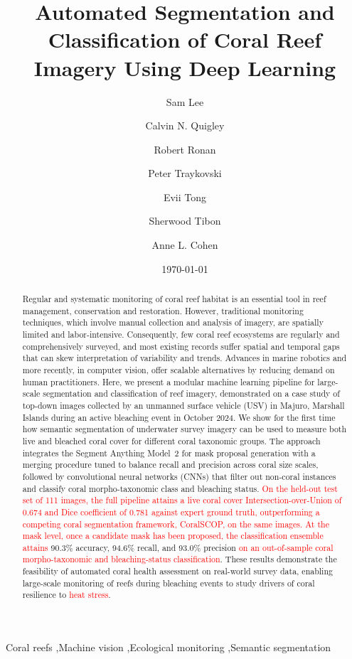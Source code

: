 \documentclass[11pt]{elsarticle}
\date{\today}
\newcommand{\revadd}[1]{\textcolor{red}{#1}}
\newcommand{\revdel}[1]{%
  \sbox\revdelbox{#1}%
  \makebox[0pt][l]{\raisebox{0.45ex}{\rule{\wd\revdelbox}{0.4pt}}}\usebox\revdelbox
}
\begin{document}
\begin{frontmatter}

\title{Automated Segmentation and Classification of Coral Reef Imagery Using Deep Learning}

\author[1,2]{Sam Lee}
\author[2]{Calvin N. Quigley}
\author[2]{Robert Ronan}
\author[2]{Peter Traykovski}
\author[2]{Evii Tong}
\author{Sherwood Tibon}
\author[2]{Anne L. Cohen}


\begin{abstract}
Regular and systematic monitoring of coral reef habitat is an essential tool in reef management, conservation and restoration. However, traditional monitoring techniques, which involve manual collection and analysis of imagery, are spatially limited and labor-intensive. Consequently, few coral reef ecosystems are regularly and comprehensively surveyed, and most existing records suffer spatial and temporal gaps that can skew interpretation of variability and trends. Advances in marine robotics and more recently, in computer vision, offer scalable alternatives by reducing demand on human practitioners. Here, we present a modular machine learning pipeline for large-scale segmentation and classification of reef imagery, demonstrated on a case study of top-down images collected by an unmanned surface vehicle (USV) in Majuro, Marshall Islands during an active bleaching event in October 2024. We show for the first time how semantic segmentation of underwater survey imagery can be used to measure both live and bleached coral cover for different coral taxonomic groups. The approach integrates the Segment Anything Model~2 for mask proposal generation with a merging procedure tuned to balance recall and precision across coral size scales, followed by convolutional neural networks (CNNs) that filter out non-coral instances and classify coral morpho-taxonomic class and bleaching status. \revadd{On the held-out test set of 111 images, the full pipeline attains a live coral cover Intersection-over-Union of 0.674 and Dice coefficient of 0.781 against expert ground truth, outperforming a competing coral segmentation framework, CoralSCOP, on the same images. At the mask level, once a candidate mask has been proposed, the classification ensemble attains} 90.3\% accuracy, 94.6\% recall, and 93.0\% precision \revadd{on an out-of-sample coral morpho-taxonomic and bleaching-status classification}. These results demonstrate the feasibility of automated coral health assessment on real-world survey data, enabling large-scale monitoring of reefs during bleaching events to study drivers of coral resilience to \revdel{heatstress}\revadd{heat stress}.
\end{abstract}


\begin{keyword}
Coral reefs \sep Machine vision \sep Ecological monitoring \sep Semantic segmentation
\end{keyword}

\end{frontmatter}
\end{document}
